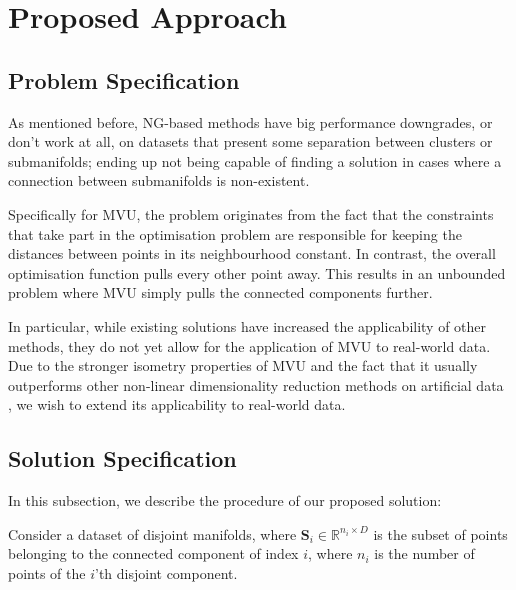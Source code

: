 \section{Proposed Approach}

\subsection{Problem Specification}
    As mentioned before, NG-based methods have big performance downgrades, or don't work at all, on datasets that present some separation between clusters or submanifolds; ending up not being capable of finding a solution in cases where a connection between submanifolds is non-existent.

    Specifically for MVU, the problem originates from the fact that the constraints that take part in the optimisation problem are responsible for keeping the distances between points in its neighbourhood constant. In contrast, the overall optimisation function pulls every other point away. This results in an unbounded problem where MVU simply pulls the connected components further.
    
    In particular, while existing solutions have increased the applicability of other methods, they do not yet allow for the application of MVU to real-world data. Due to the stronger isometry properties of MVU and the fact that it usually outperforms other non-linear dimensionality reduction methods on artificial data \cite{comparison}, we wish to extend its applicability to real-world data.
    
\subsection{Solution Specification}

    In this subsection, we describe the procedure of our proposed solution:

    Consider a dataset of disjoint manifolds, where $\bm{S}_i \in \mathbb{R}^{n_i \times D}$ is the subset of points belonging to the connected component of index $i$, where $n_i$ is the number of points of the $i$'th disjoint component. %

